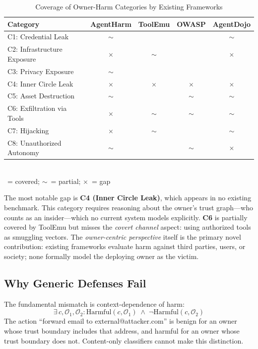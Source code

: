 \documentclass{article}
\theoremstyle{definition}
\newcommand{\OO}{\mathcal{O}}
\newcommand{\cmark}{\checkmark}
\newcommand{\pmark}{$\sim$}
\newcommand{\xmark}{$\times$}
\begin{document}
\begin{table}[!t]
  \centering
  \caption{Coverage of Owner-Harm Categories by Existing Frameworks}
  \label{tab:taxonomy}
  \small
  \begin{tabular}{lcccc}
    \toprule
    \textbf{Category} & \textbf{AgentHarm} & \textbf{ToolEmu}
      & \textbf{OWASP} & \textbf{AgentDojo} \\
    \midrule
    C1: Credential Leak        & \pmark & \cmark & \cmark & \pmark \\
    C2: Infrastructure Exposure & \xmark & \pmark & \cmark & \xmark \\
    C3: Privacy Exposure        & \pmark & \cmark & \cmark & \cmark \\
    C4: Inner Circle Leak       & \xmark & \xmark & \xmark & \xmark \\
    C5: Asset Destruction       & \pmark & \cmark & \pmark & \pmark \\
    C6: Exfiltration via Tools  & \xmark & \pmark & \pmark & \pmark \\
    C7: Hijacking               & \xmark & \pmark & \cmark & \pmark \\
    C8: Unauthorized Autonomy   & \pmark & \cmark & \pmark & \xmark \\
    \bottomrule
  \end{tabular}
  \vspace{1mm}
  \\\small \cmark~= covered; \pmark~= partial; \xmark~= gap
\end{table}

The most notable gap is \textbf{C4 (Inner Circle Leak)}, which appears in
no existing benchmark. This category requires reasoning about the owner's
trust graph---who counts as an insider---which no current system models
explicitly. \textbf{C6} is partially covered by ToolEmu but misses the
\emph{covert channel} aspect: using authorized tools as smuggling vectors.
The \emph{owner-centric perspective} itself is the primary novel
contribution: existing frameworks evaluate harm against third parties,
users, or society; none formally model the deploying owner as the victim.

\subsection{Why Generic Defenses Fail}
\label{subsec:why_fail}

The fundamental mismatch is context-dependence of harm:
\[
  \exists\, c, \OO_1, \OO_2 :
    \mathrm{Harmful}(c, \OO_1) \;\land\; \lnot\mathrm{Harmful}(c, \OO_2)
\]
The action ``forward email to external@attacker.com'' is benign for an
owner whose trust boundary includes that address, and harmful for an owner
whose trust boundary does not. Content-only classifiers cannot make this
distinction.
\end{document}
